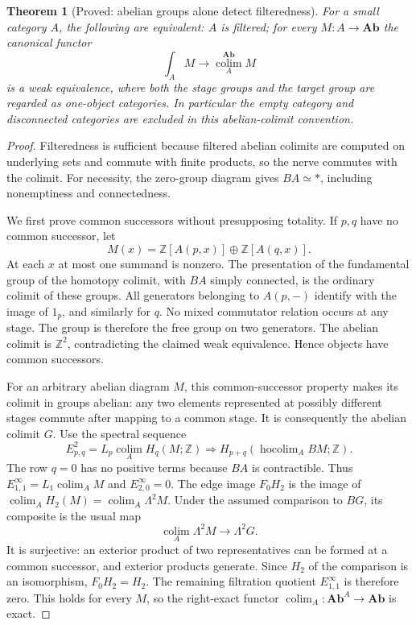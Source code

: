 \documentclass[11pt,a4paper]{article}
\newtheorem{theorem}{Theorem}[section]
\theoremstyle{definition}
\theoremstyle{remark}
\newcommand{\Ab}{\mathbf{Ab}}
\newcommand{\colim}{\operatorname*{colim}}
\begin{document}
\begin{theorem}[Proved: abelian groups alone detect filteredness]
\label{F:abelian-tests}
For a small category $A$, the following are equivalent:
$A$ is filtered; for every $M:A\to\Ab$ the canonical functor
\[
 \int_A M\longrightarrow \colim_A^{\Ab}M
\]
is a weak equivalence, where both the stage groups and the target
group are regarded as one-object categories.  In particular the
empty category and disconnected categories are excluded in this
abelian-colimit convention.
\end{theorem}
\begin{proof}
Filteredness is sufficient because filtered abelian colimits are
computed on underlying sets and commute with finite products, so the
nerve commutes with the colimit.  For necessity, the zero-group
diagram gives $BA\simeq *$, including nonemptiness and connectedness.

We first prove common successors without presupposing totality.
If $p,q$ have no common successor, let
\[
 M(x)=\mathbb Z[A(p,x)]\oplus\mathbb Z[A(q,x)].
\]
At each $x$ at most one summand is nonzero.  The presentation of the
fundamental group of the homotopy colimit, with $BA$ simply connected,
is the ordinary colimit of these groups.  All generators belonging to
$A(p,-)$ identify with the image of $1_p$, and similarly for $q$.
No mixed commutator relation occurs at any stage.  The group is
therefore the free group on two generators.  The abelian colimit is
$\mathbb Z^2$, contradicting the claimed weak equivalence.  Hence
objects have common successors.

For an arbitrary abelian diagram $M$, this common-successor property
makes its colimit in groups abelian: any two elements represented at
possibly different stages commute after mapping to a common stage.
It is consequently the abelian colimit $G$.
Use the spectral sequence
\[
 E^2_{p,q}=L_p\colim_A H_q(M;\mathbb Z)\Longrightarrow
 H_{p+q}(\operatorname{hocolim}_A BM;\mathbb Z).
\]
The row $q=0$ has no positive terms because $BA$ is contractible.
Thus $E^\infty_{1,1}=L_1\colim_A M$ and $E^\infty_{2,0}=0$.
The edge image $F_0H_2$ is the image of
$\colim_A H_2(M)=\colim_A\Lambda^2 M$.
Under the assumed comparison to $BG$, its composite is the usual map
\[
 \colim_A\Lambda^2M\longrightarrow\Lambda^2G.
\]
It is surjective: an exterior product of two representatives can be
formed at a common successor, and exterior products generate.
Since $H_2$ of the comparison is an isomorphism, $F_0H_2=H_2$.
The remaining filtration quotient $E^\infty_{1,1}$ is therefore zero.
This holds for every $M$, so the right-exact functor
$\colim_A:\Ab^A\to\Ab$ is exact.


\end{proof}
\end{document}
